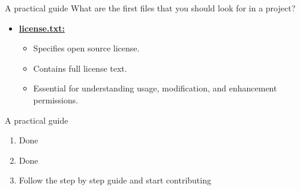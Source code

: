 \begin{frame}{A practical guide}
    What are the first files that you should look for in a project?
    \begin{itemize}
            \item 
            \href{https://github.com/firstcontributions/first-contributions/blob/main/LICENSE}{\textbf{license.txt:}}
        \begin{itemize}
            \item Specifies open source license.
            \item Contains full license text.
            \item Essential for understanding usage, modification, and enhancement permissions.
        \end{itemize}
    \end{itemize}

\end{frame}

\begin{frame}{A practical guide}
    \begin{enumerate}
        \item Done
        \item Done
        \item Follow the step by step guide and start contributing
    \end{enumerate}
\end{frame}
